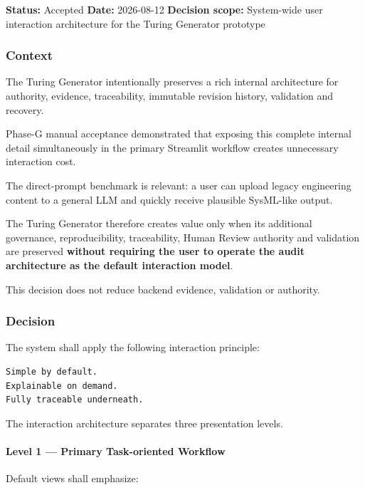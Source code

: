 \textbf{Status:} Accepted \textbf{Date:} 2026-08-12 \textbf{Decision scope:} System-wide user interaction architecture for the Turing Generator prototype

\hypertarget{context-2}{%
\subsubsection{Context}\label{context-2}}

The Turing Generator intentionally preserves a rich internal architecture for authority, evidence, traceability, immutable revision history, validation and recovery.

Phase-G manual acceptance demonstrated that exposing this complete internal detail simultaneously in the primary Streamlit workflow creates unnecessary interaction cost.

The direct-prompt benchmark is relevant: a user can upload legacy engineering content to a general LLM and quickly receive plausible SysML-like output.

The Turing Generator therefore creates value only when its additional governance, reproducibility, traceability, Human Review authority and validation are preserved \textbf{without requiring the user to operate the audit architecture as the default interaction model}.

This decision does not reduce backend evidence, validation or authority.

\hypertarget{decision-2}{%
\subsubsection{Decision}\label{decision-2}}

The system shall apply the following interaction principle:

\begin{verbatim}
Simple by default.
Explainable on demand.
Fully traceable underneath.
\end{verbatim}

The interaction architecture separates three presentation levels.

\hypertarget{level-1--primary-task-oriented-workflow}{%
\paragraph{Level 1 --- Primary Task-oriented Workflow}\label{level-1--primary-task-oriented-workflow}}

Default views shall emphasize:

